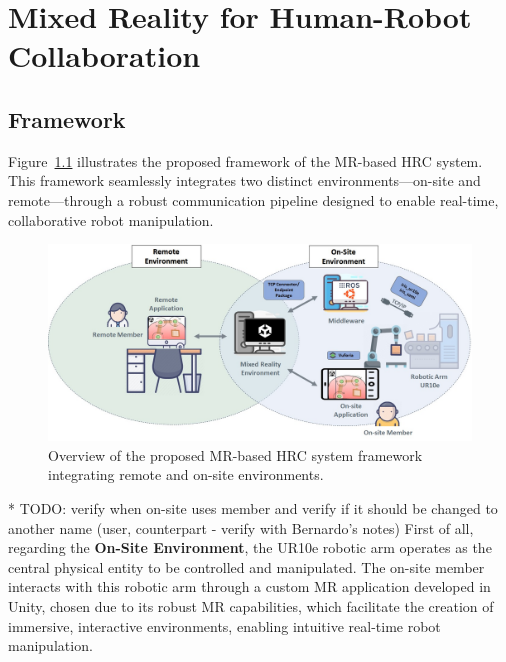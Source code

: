\chapter{Mixed Reality for Human-Robot Collaboration}%
\label{chapter:on-site}


\section{Framework}

Figure~\ref{fig:project_framework} illustrates the proposed framework of the \ac{MR}-based \ac{HRC} system. This framework seamlessly integrates two distinct environments—on-site and remote—through a robust communication pipeline designed to enable real-time, collaborative robot manipulation.

\begin{figure}[h]
    \centering
    \includegraphics[width=\linewidth]{figs/framework-1.jpeg}
    \caption{Overview of the proposed \ac{MR}-based \ac{HRC} system framework integrating remote and on-site environments.}
    \label{fig:project_framework}
\end{figure}
* TODO: verify when on-site uses member and verify if it should be changed to another name (user, counterpart - verify with Bernardo's notes)
First of all, regarding the \textbf{On-Site Environment}, the UR10e robotic arm operates as the central physical entity to be controlled and manipulated. The on-site member interacts with this robotic arm through a custom \ac{MR} application developed in Unity, chosen due to its robust \ac{MR} capabilities, which facilitate the creation of immersive, interactive environments, enabling intuitive real-time robot manipulation.

